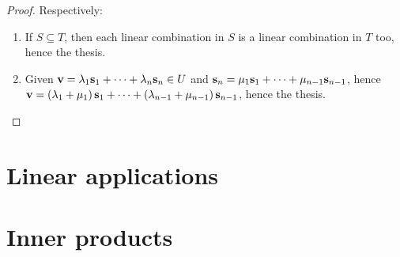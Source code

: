 \begin{proofbox}
  \begin{proof}
    Respectively:
    \begin{enumerate}[label = {\alph*.}]
      \item If $ S \subseteq T $, then each linear combination in $ S $ is a linear combination in $ T $ too, hence the thesis.
      \item Given $ \mathbf{v} = \lambda_1 \mathbf{s}_1 + \dots + \lambda_n \mathbf{s}_n \in U $ and $ \mathbf{s}_n = \mu_1 \mathbf{s}_1 + \dots + \mu_{n-1} \mathbf{s}_{n-1} $, hence $ \mathbf{v} = \left( \lambda_1 + \mu_1 \right) \mathbf{s}_1 + \dots + \left( \lambda_{n-1} + \mu_{n-1} \right) \mathbf{s}_{n-1} $, hence the thesis.
    \end{enumerate}
  \end{proof}
\end{proofbox}







\section{Linear applications}

\section{Inner products}
